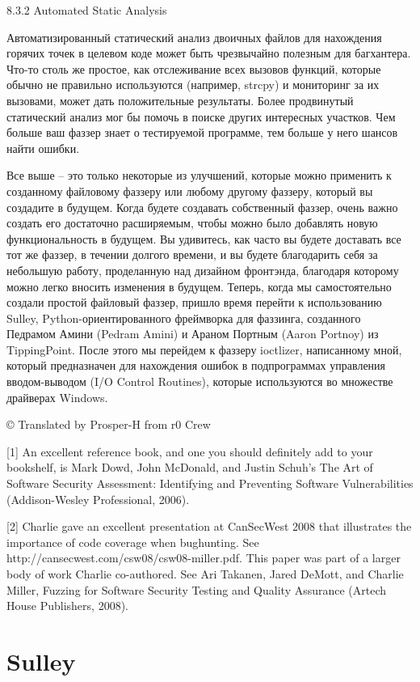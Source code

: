 \documentclass[12pt]{book}
\begin{document}
8.3.2 Automated Static Analysis

Автоматизированный статический анализ двоичных файлов для нахождения горячих точек в целевом коде может быть чрезвычайно полезным для багхантера. Что-то столь же простое, как отслеживание всех вызовов функций, которые обычно не правильно используются (например, strcpy) и мониторинг за их вызовами, может дать положительные результаты. Более продвинутый статический анализ мог бы помочь в поиске других интересных участков. Чем больше ваш фаззер знает о тестируемой программе, тем больше у него шансов найти ошибки.

Все выше – это только некоторые из улучшений, которые можно применить к созданному файловому фаззеру или любому другому фаззеру, который вы создадите в будущем. Когда будете создавать собственный фаззер, очень важно создать его достаточно расширяемым, чтобы можно было добавлять новую функциональность в будущем. Вы удивитесь, как часто вы будете доставать все тот же фаззер, в течении долгого времени, и вы будете благодарить себя за небольшую работу, проделанную над дизайном фронтэнда, благодаря которому можно легко вносить изменения в будущем. Теперь, когда мы самостоятельно создали простой файловый фаззер, пришло время перейти к использованию Sulley, Python-ориентированного фреймворка для фаззинга, созданного Педрамом Амини (Pedram Amini) и Араном Портным (Aaron Portnoy) из TippingPoint. После этого мы перейдем к фаззеру ioctlizer, написанному мной, который предназначен для нахождения ошибок в подпрограммах управления вводом-выводом (I/O Control Routines), которые используются во множестве драйверах Windows.


© Translated by Prosper-H from r0 Crew


[1] An excellent reference book, and one you should definitely add to your bookshelf, is Mark Dowd, John McDonald, and Justin Schuh’s The Art of Software Security Assessment: Identifying and Preventing Software Vulnerabilities (Addison-Wesley Professional, 2006).

[2] Charlie gave an excellent presentation at CanSecWest 2008 that illustrates the importance of code coverage when bughunting. See http://cansecwest.com/csw08/csw08-miller.pdf. This paper was part of a larger body of work Charlie co-authored. See Ari Takanen, Jared DeMott, and Charlie Miller, Fuzzing for Software Security Testing and Quality Assurance (Artech House Publishers, 2008).

\chapter{Sulley}
\end{document}
